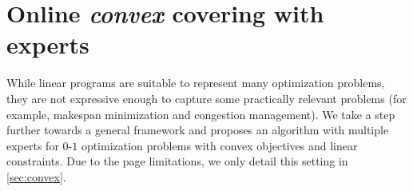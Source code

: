 \section{Online \emph{convex} covering with experts}

While linear programs are suitable to represent many optimization problems, they are not expressive enough to capture some practically relevant problems (for example, makespan minimization and congestion management). We take a step further towards a general framework and proposes an algorithm with multiple experts for $0$-$1$ optimization problems with convex objectives and linear constraints. Due to the page limitations, we only detail this setting in \cref{sec:convex}.
